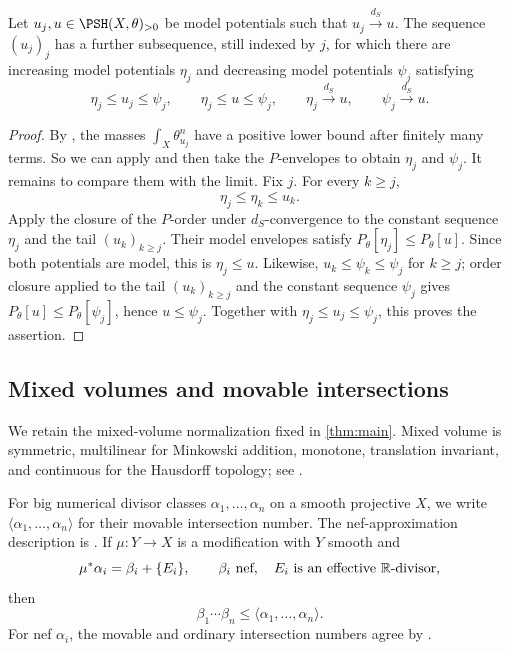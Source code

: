 \documentclass[11pt,a4paper]{amsart}
\newcommand{\dS}{d_{S}}
\begin{document}
\begin{lemma}\label{lem:potential-sandwich}
Let $u_j,u\in\PSH(X,\theta)_{>0}$ be model potentials such
that $u_j\xrightarrow{\dS}u$. The sequence $(u_j)_j$ has a further subsequence, still indexed by $j$, for which there are increasing model potentials $\eta_{j}$ and decreasing model potentials $\psi_{j}$ satisfying
\[
 \eta_{j}\leq u_{j}\leq\psi_{j},\qquad
 \eta_{j}\leq u\leq\psi_{j},\qquad
 \eta_{j}\xrightarrow{\dS}u,\qquad
 \psi_{j}\xrightarrow{\dS}u.
\]
\end{lemma}

\begin{proof}
By \cite[Corollary~6.2.5]{Xiabook}, the masses $\int_X\theta_{u_j}^n$ have a positive lower bound after finitely many terms. So we can apply \cite[Proposition~6.2.3]{Xiabook} and then take the $P$-envelopes to obtain $\eta_j$ and $\psi_j$.  It remains to compare them with the limit.  Fix $j$.  For every $k\geq j$,
\[
 \eta_j\leq\eta_k\leq u_k.
\]
Apply the closure of the $P$-order under $\dS$-convergence
\cite[Proposition~6.2.5]{Xiabook} to the constant sequence $\eta_j$ and
the tail $(u_k)_{k\geq j}$.  Their model envelopes satisfy
$P_\theta[\eta_j]\leq P_\theta[u]$.  Since both potentials are model, this
is $\eta_j\leq u$.  Likewise, $u_k\leq\psi_k\leq\psi_j$ for $k\geq j$;
order closure applied to the tail $(u_k)_{k\geq j}$ and the constant
sequence $\psi_j$ gives $P_\theta[u]\leq P_\theta[\psi_j]$, hence
$u\leq\psi_j$.  Together with $\eta_j\leq u_j\leq\psi_j$, this proves the
assertion.
\end{proof}

\subsection{Mixed volumes and movable intersections}

We retain the mixed-volume normalization fixed in \cref{thm:main}.  Mixed
volume is symmetric, multilinear for Minkowski addition, monotone,
translation invariant, and continuous for the Hausdorff topology; see
\cite[Section~5.1]{Sch14}.

For big numerical divisor classes $\alpha_1,\ldots,\alpha_n$ on a smooth projective $X$, we write
$\langle \alpha_1,\ldots,\alpha_n \rangle$ for their movable intersection number.  The nef-approximation description is \cite[Definition~2.5 and Proposition~2.13]{BFJ09}.  If $\mu\colon Y\to X$ is a modification with $Y$ smooth and
\[
 \mu^*\alpha_i=\beta_i+\{E_i\},
 \qquad \beta_i\ \text{nef},\quad E_i\textup{ is an effective }\mathbb{R}\textup{-divisor},
\]
then
\begin{equation}\label{eq:movable-admissible}
 \beta_1\cdots \beta_n\leq\langle \alpha_1,\ldots,\alpha_n\rangle.
\end{equation}
For nef $\alpha_i$, the movable and ordinary intersection numbers agree by
\cite[Proposition~2.12]{BFJ09}.
\end{document}
